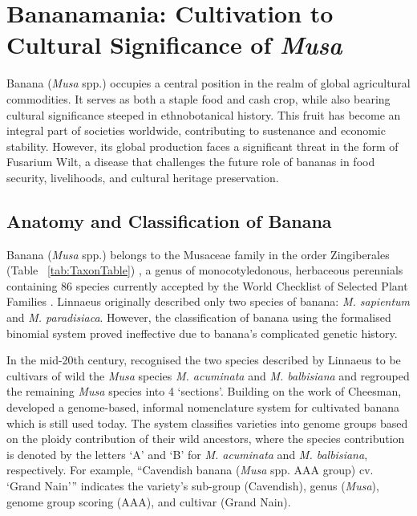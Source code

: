\section {Bananamania: Cultivation to Cultural Significance of \textit{Musa}}

Banana (\textit{Musa} spp.) occupies a central position in the realm of global agricultural commodities. It serves as both a staple food and cash crop, while also bearing cultural significance steeped in ethnobotanical history. This fruit has become an integral part of societies worldwide, contributing to sustenance and economic stability. However, its global production faces a significant threat in the form of Fusarium Wilt, a disease that challenges the future role of bananas in food security, livelihoods, and cultural heritage preservation. 

\subsection{Anatomy and Classification of Banana}  

Banana (\textit{Musa} spp.) belongs to the Musaceae family in the order Zingiberales (Table ~\ref{tab:TaxonTable}) \parencite{Schoch2020}, a genus of monocotyledonous, herbaceous perennials containing 86 species currently accepted by the World Checklist of Selected Plant Families \parencite{WCSPF2023}. Linnaeus originally described only two species of banana: \textit{M. sapientum }and \textit{M. paradisiaca}. However, the classification of banana using the formalised binomial system proved ineffective due to banana’s complicated genetic history.



In the mid-20th century, \textcite{Cheesman1947} recognised the two species described by Linnaeus to be cultivars of wild the \textit{Musa} species \textit{M. acuminata }and \textit{M. balbisiana} and regrouped the remaining \textit{Musa} species into 4 ‘sections’. Building on the work of Cheesman, \textcite{Simmonds1955} developed a genome-based, informal nomenclature system for cultivated banana which is still used today. The system classifies varieties into genome groups based on the ploidy contribution of their wild ancestors, where the species contribution is denoted by the letters ‘A’ and ‘B’ for \textit{M. acuminata} and \textit{M. balbisiana}, respectively. For example, “Cavendish banana (\textit{Musa } spp. AAA group) cv. ‘Grand Nain’” indicates the variety’s sub-group (Cavendish), genus (\textit{Musa}), genome group scoring (AAA), and cultivar (Grand Nain).

